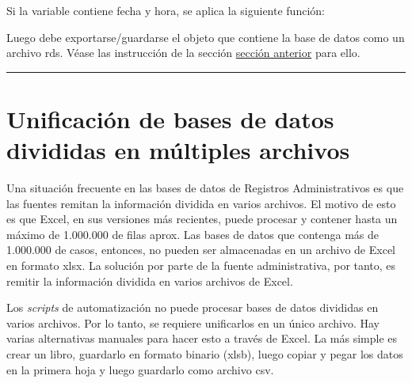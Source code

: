\documentclass[
  spanish,
]{book}
\newenvironment{Shaded}{\begin{snugshade}}{\end{snugshade}}
\newcommand{\AttributeTok}[1]{\textcolor[rgb]{0.77,0.63,0.00}{#1}}
\newcommand{\CommentTok}[1]{\textcolor[rgb]{0.56,0.35,0.01}{\textit{#1}}}
\newcommand{\ErrorTok}[1]{\textcolor[rgb]{0.64,0.00,0.00}{\textbf{#1}}}
\newcommand{\FunctionTok}[1]{\textcolor[rgb]{0.00,0.00,0.00}{#1}}
\newcommand{\NormalTok}[1]{#1}
\newcommand{\SpecialCharTok}[1]{\textcolor[rgb]{0.00,0.00,0.00}{#1}}
\newcommand{\StringTok}[1]{\textcolor[rgb]{0.31,0.60,0.02}{#1}}
\begin{document}
Si la variable contiene fecha y hora, se aplica la siguiente función:

\begin{Shaded}
\end{Shaded}

Luego debe exportarse/guardarse el objeto que contiene la base de datos como un archivo rds. Véase las instrucción de la sección \protect\hyperlink{rds}{sección anterior} para ello.

\begin{center}\rule{0.5\linewidth}{0.5pt}\end{center}

\hypertarget{unificaciuxf3n-de-bases-de-datos-divididas-en-muxfaltiples-archivos}{%
\section{Unificación de bases de datos divididas en múltiples archivos}\label{unificaciuxf3n-de-bases-de-datos-divididas-en-muxfaltiples-archivos}}

Una situación frecuente en las bases de datos de Registros Administrativos es que las fuentes remitan la información dividida en varios archivos. El motivo de esto es que Excel, en sus versiones más recientes, puede procesar y contener hasta un máximo de 1.000.000 de filas aprox. Las bases de datos que contenga más de 1.000.000 de casos, entonces, no pueden ser almacenadas en un archivo de Excel en formato xlsx. La solución por parte de la fuente administrativa, por tanto, es remitir la información dividida en varios archivos de Excel.

Los \emph{scripts} de automatización no puede procesar bases de datos divididas en varios archivos. Por lo tanto, se requiere unificarlos en un único archivo. Hay varias alternativas manuales para hacer esto a través de Excel. La más simple es crear un libro, guardarlo en formato binario (xlsb), luego copiar y pegar los datos en la primera hoja y luego guardarlo como archivo csv.
\end{document}
